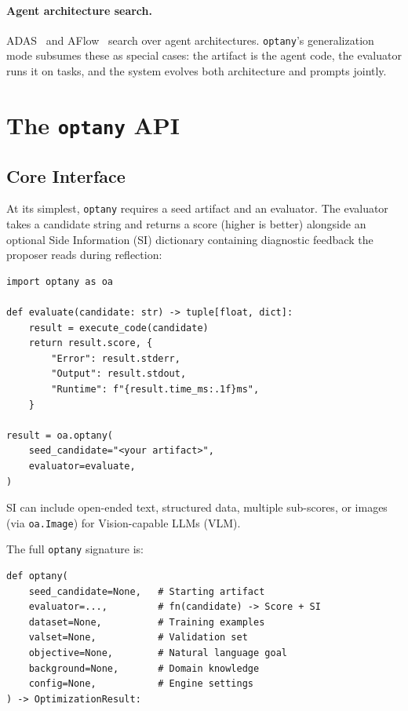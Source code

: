 \documentclass[sigconf,anonymous,review]{acmart}
\newcommand{\oa}{\texttt{optany}}
\newcommand{\asi}{SI}
\begin{document}
\paragraph{Agent architecture search.}
ADAS~\cite{hu2024automated} and AFlow~\cite{zhang2024aflow} search over agent architectures. \oa{}'s generalization mode subsumes these as special cases: the artifact is the agent code, the evaluator runs it on tasks, and the system evolves both architecture and prompts jointly.

\section{The \oa{} API}\label{sec:api}

\subsection{Core Interface}

At its simplest, \oa{} requires a seed artifact and an evaluator. The evaluator takes a candidate string and returns a score (higher is better) alongside an optional Side Information (\asi{}) dictionary containing diagnostic feedback the proposer reads during reflection:

\begin{lstlisting}
import optany as oa

def evaluate(candidate: str) -> tuple[float, dict]:
    result = execute_code(candidate)
    return result.score, {
        "Error": result.stderr,
        "Output": result.stdout,
        "Runtime": f"{result.time_ms:.1f}ms",
    }

result = oa.optany(
    seed_candidate="<your artifact>",
    evaluator=evaluate,
)
\end{lstlisting}

\asi{} can include open-ended text, structured data, multiple sub-scores, or images (via \texttt{oa.Image}) for Vision-capable LLMs (VLM).

The full \oa{} signature is:
\begin{lstlisting}
def optany(
    seed_candidate=None,   # Starting artifact
    evaluator=...,         # fn(candidate) -> Score + SI
    dataset=None,          # Training examples
    valset=None,           # Validation set
    objective=None,        # Natural language goal
    background=None,       # Domain knowledge
    config=None,           # Engine settings
) -> OptimizationResult:
\end{lstlisting}
\end{document}

